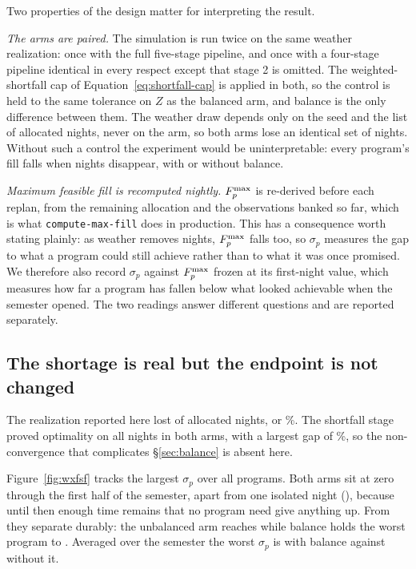 \documentclass[twocolumn,linenumbers]{aastex63}
\newcommand{\maff}{\ensuremath{F^{\rm max}_p}\xspace}
\newcommand{\fsf}{\ensuremath{\sigma_p}\xspace}
\begin{document}
Two properties of the design matter for interpreting the result.

\emph{The arms are paired.} The simulation is run twice on the same weather
realization: once with the full five-stage pipeline, and once with a four-stage
pipeline identical in every respect except that stage 2 is omitted. The
weighted-shortfall cap of Equation~\ref{eq:shortfall-cap} is applied in both, so the
control is held to the same tolerance on $Z$ as the balanced arm, and balance is
the only difference between them. The weather draw depends only on the seed and
the list of allocated nights, never on the arm, so both arms lose an identical
set of nights. Without such a control the experiment would be uninterpretable:
every program's fill falls when nights disappear, with or without balance.

\emph{Maximum feasible fill is recomputed nightly.} \maff is re-derived before
each replan, from the remaining allocation and the observations banked so far,
which is what \texttt{compute-max-fill} does in production. This has a
consequence worth stating plainly: as weather removes nights, \maff falls too,
so \fsf measures the gap to what a program could still achieve rather than to
what it was once promised. We therefore also record \fsf against \maff frozen at
its first-night value, which measures how far a program has fallen below what
looked achievable when the semester opened. The two readings answer different
questions and are reported separately.

\subsection{The shortage is real but the endpoint is not changed}
\label{sec:weather:result}

The realization reported here lost  of 
allocated nights, or \%. The shortfall stage proved
optimality on all  nights in both arms, with
a largest gap of \%, so the non-convergence
that complicates \S\ref{sec:balance} is absent here.

Figure~\ref{fig:wxfsf} tracks the largest \fsf over all programs. Both arms sit
at zero through the first half of the semester, apart from one isolated night
(), because until then enough time remains that no program
need give anything up. From  they separate durably: the
unbalanced arm reaches  while balance holds the worst
program to . Averaged over the semester the worst \fsf
is  with balance against 
without it.
\end{document}
